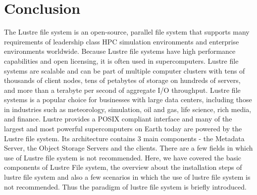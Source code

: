 \documentclass[9pt,twocolumn,twoside]{styles/osajnl}
\begin{document}
\section{Conclusion}

The Lustre file system is an open-source, parallel file system that
supports many requirements of leadership class HPC simulation
environments and enterprise environments worldwide. Because Lustre
file systems have high performance capabilities and open licensing, it
is often used in supercomputers. Lustre file systems are scalable and
can be part of multiple computer clusters with tens of thousands of
client nodes, tens of petabytes of storage on hundreds of servers, and
more than a terabyte per second of aggregate I/O throughput. Lustre
file systems is a popular choice for businesses with large data
centers, including those in industries such as meteorology,
simulation, oil and gas, life science, rich media, and finance. Lustre
provides a POSIX compliant interface and many of the largest and most
powerful supercomputers on Earth today are powered by the Lustre file
system. Its architecture contains 3 main components - the Metadata
Server, the Object Storage Servers and the clients. There are a few
fields in which use of Lustre file system is not recommended. Here, we
have covered the basic components of Lustre File system, the overview
about the installation steps of lustre file system and also a few
scenarios in which the use of lustre file system is not
recommended. Thus the paradigm of lustre file system is briefly
introduced.



\end{document}
